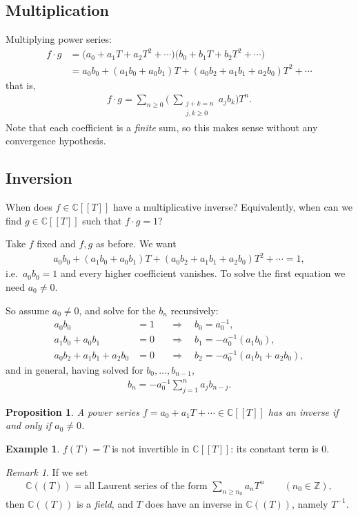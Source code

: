\documentclass[11pt]{article}
\theoremstyle{plain}
\newtheorem{proposition}[theorem]{Proposition}
\theoremstyle{definition}
\newtheorem{example}[theorem]{Example}
\theoremstyle{remark}
\newtheorem*{remark}{Remark}
\numberwithin{equation}{section}
\newcommand{\be}{\begin{eqnarray}}
\newcommand{\ee}{\end{eqnarray}}
\newcommand{\C}{\mathbb{C}}
\newcommand{\CT}{\C[[T]]}
\newcommand{\CLT}{\C((T))}
\begin{document}
\subsection*{Multiplication}
Multiplying power series:
\begin{align*}
 f\cdot g
 &=\bigl(a_0+a_1T+a_2T^2+\cdots\bigr)\bigl(b_0+b_1T+b_2T^2+\cdots\bigr)\\
 &=a_0b_0+(a_1b_0+a_0b_1)T+(a_0b_2+a_1b_1+a_2b_0)T^2+\cdots
\end{align*}
that is,
\be
 f\cdot g=\sum_{n\ge0}\Biggl(\ \sum_{\substack{j+k=n\\j,k\ge0}}a_jb_k\Biggr)T^n.
\ee
Note that each coefficient is a \emph{finite} sum, so this makes sense
without any convergence hypothesis.

\subsection{Inversion}
When does $f\in\CT$ have a multiplicative inverse? Equivalently, when can we
find $g\in\CT$ such that $f\cdot g=1$?

Take $f$ fixed and $f,g$ as before. We want
\be
 a_0b_0+(a_1b_0+a_0b_1)T+(a_0b_2+a_1b_1+a_2b_0)T^2+\cdots=1,
\ee
i.e.\ $a_0b_0=1$ and every higher coefficient vanishes. To solve the first
equation we need $a_0\ne0$.

So assume $a_0\ne0$, and solve for the $b_n$ recursively:
\begin{align*}
 a_0b_0&=1 &&\Longrightarrow\quad b_0=a_0^{-1},\\
 a_1b_0+a_0b_1&=0 &&\Longrightarrow\quad b_1=-a_0^{-1}(a_1b_0),\\
 a_0b_2+a_1b_1+a_2b_0&=0 &&\Longrightarrow\quad b_2=-a_0^{-1}(a_1b_1+a_2b_0),
\end{align*}
and in general, having solved for $b_0,\dots,b_{n-1}$,
\be
 b_n=-a_0^{-1}\sum_{j=1}^{n}a_jb_{n-j}.
\ee

\begin{proposition}
A power series $f=a_0+a_1T+\cdots\in\CT$ has an inverse if and only if
$a_0\ne0$.
\end{proposition}

\begin{example}
$f(T)=T$ is not invertible in $\CT$: its constant term is $0$.
\end{example}

\begin{remark}
If we set
\be
 \CLT=\text{all Laurent series of the form }\sum_{n\ge n_0}a_nT^n
 \qquad(n_0\in\mathbb Z),
\ee
then $\CLT$ is a \emph{field}, and $T$ does have an inverse in $\CLT$,
namely $T^{-1}$.
\end{remark}
\end{document}
